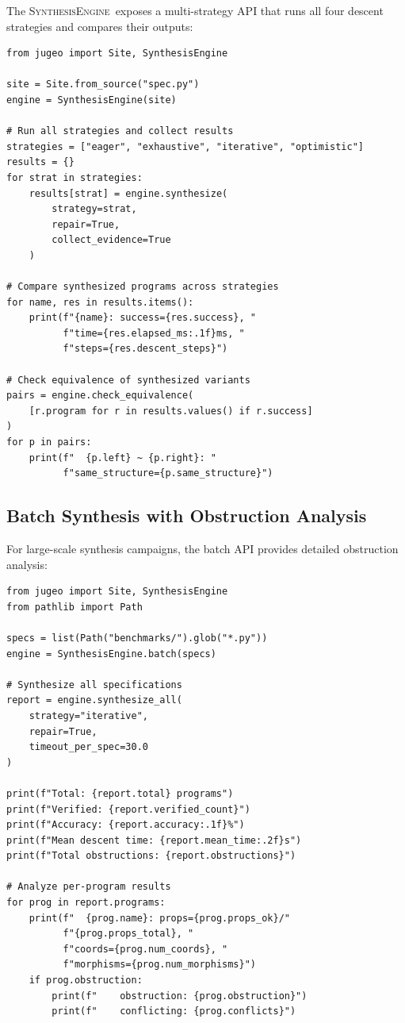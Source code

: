\documentclass[11pt]{article}
\newcommand{\SynthEngine}{\textsc{SynthesisEngine}}
\begin{document}
The \SynthEngine\ exposes a multi-strategy API that runs all four
descent strategies and compares their outputs:

\begin{lstlisting}[style=jugeo-python]
from jugeo import Site, SynthesisEngine

site = Site.from_source("spec.py")
engine = SynthesisEngine(site)

# Run all strategies and collect results
strategies = ["eager", "exhaustive", "iterative", "optimistic"]
results = {}
for strat in strategies:
    results[strat] = engine.synthesize(
        strategy=strat,
        repair=True,
        collect_evidence=True
    )

# Compare synthesized programs across strategies
for name, res in results.items():
    print(f"{name}: success={res.success}, "
          f"time={res.elapsed_ms:.1f}ms, "
          f"steps={res.descent_steps}")

# Check equivalence of synthesized variants
pairs = engine.check_equivalence(
    [r.program for r in results.values() if r.success]
)
for p in pairs:
    print(f"  {p.left} ~ {p.right}: "
          f"same_structure={p.same_structure}")
\end{lstlisting}

\subsection{Batch Synthesis with Obstruction Analysis}

For large-scale synthesis campaigns, the batch API provides
detailed obstruction analysis:

\begin{lstlisting}[style=jugeo-python]
from jugeo import Site, SynthesisEngine
from pathlib import Path

specs = list(Path("benchmarks/").glob("*.py"))
engine = SynthesisEngine.batch(specs)

# Synthesize all specifications
report = engine.synthesize_all(
    strategy="iterative",
    repair=True,
    timeout_per_spec=30.0
)

print(f"Total: {report.total} programs")
print(f"Verified: {report.verified_count}")
print(f"Accuracy: {report.accuracy:.1f}%")
print(f"Mean descent time: {report.mean_time:.2f}s")
print(f"Total obstructions: {report.obstructions}")

# Analyze per-program results
for prog in report.programs:
    print(f"  {prog.name}: props={prog.props_ok}/"
          f"{prog.props_total}, "
          f"coords={prog.num_coords}, "
          f"morphisms={prog.num_morphisms}")
    if prog.obstruction:
        print(f"    obstruction: {prog.obstruction}")
        print(f"    conflicting: {prog.conflicts}")
\end{lstlisting}
\end{document}
